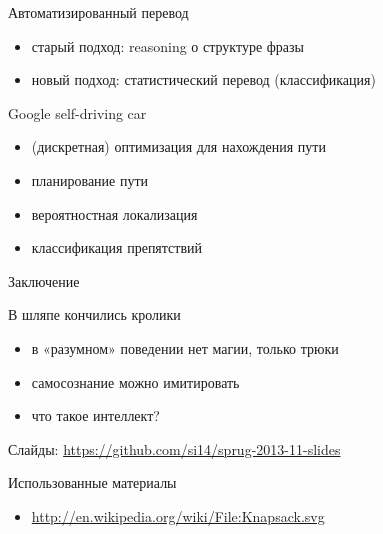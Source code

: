 \documentclass[10pt]{beamer}
\begin{document}
\begin{frame}{Автоматизированный перевод}
  \begin{itemize}
  \item старый подход: reasoning о структуре фразы
  \item новый подход: статистический перевод (классификация)
  \end{itemize}
\end{frame}

\begin{frame}{Google self-driving car}
  \begin{itemize}
  \item (дискретная) оптимизация для нахождения пути
  \item планирование пути
  \item вероятностная локализация
  \item классификация препятствий
  \end{itemize}
\end{frame}

\begin{frame}
  \Large
  Заключение
\end{frame}

\begin{frame}{В шляпе кончились кролики}
  \begin{itemize}
  \item в «разумном» поведении нет магии, только трюки
  \item самосознание можно имитировать
  \item что такое интеллект?
  \end{itemize}
  \begin{center}
    Слайды: \url{https://github.com/si14/sprug-2013-11-slides}
  \end{center}
\end{frame}

\begin{frame}{Использованные материалы}\label{lastframe}
  \footnotesize
  \begin{itemize}
  \item \url{http://en.wikipedia.org/wiki/File:Knapsack.svg}
  \end{itemize}
\end{frame}
\end{document}
